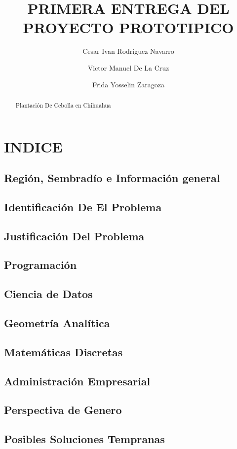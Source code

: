 \documentclass[12pt]{article}
\title{PRIMERA ENTREGA DEL PROYECTO PROTOTIPICO}
\author{Cesar Ivan Rodriguez Navarro \and 
	Victor Manuel De La Cruz \and 
	Frida Yosselin Zaragoza }
\begin{document}
\maketitle 

\begin{abstract}
Plantación De Cebolla en Chihuahua
\end{abstract}

\section{INDICE}
\subsection{Región, Sembradío e Información general}
\subsection{Identificación  De El Problema}
\subsection{Justificación Del Problema}
\subsection{Programación}
\subsection{Ciencia de Datos}
\subsection{Geometría Analítica}
\subsection{Matemáticas Discretas}
\subsection{Administración Empresarial}
\subsection{Perspectiva de Genero}
\subsection{Posibles Soluciones Tempranas}
\end{document}
